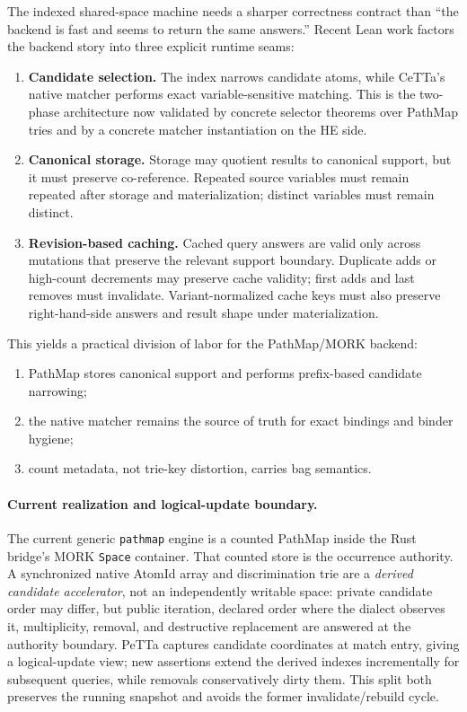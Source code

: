 \documentclass[11pt]{article}
\newcommand{\code}[1]{\texttt{#1}}
\newcommand{\PeTTa}{\textup{PeTTa}}
\newcommand{\HE}{\textup{HE}}
\newcommand{\CeTTa}{\textup{CeTTa}}
\newcommand{\PathMap}{\textup{PathMap}}
\begin{document}
The indexed shared-space machine needs a sharper correctness contract than
``the backend is fast and seems to return the same answers.''  Recent Lean
work factors the backend story into three explicit runtime seams:
\begin{enumerate}
\item \textbf{Candidate selection.}
  The index narrows candidate atoms, while \CeTTa{}'s native matcher performs
  exact variable-sensitive matching.  This is the two-phase architecture now
  validated by concrete selector theorems over \PathMap{} tries and by a
  concrete matcher instantiation on the \HE{} side.
\item \textbf{Canonical storage.}
  Storage may quotient results to canonical support, but it must preserve
  co-reference.  Repeated source variables must remain repeated after storage
  and materialization; distinct variables must remain distinct.
\item \textbf{Revision-based caching.}
  Cached query answers are valid only across mutations that preserve the
  relevant support boundary.  Duplicate adds or high-count decrements may
  preserve cache validity; first adds and last removes must invalidate.
  Variant-normalized cache keys must also preserve right-hand-side answers and
  result shape under materialization.
\end{enumerate}

This yields a practical division of labor for the PathMap/MORK backend:
\begin{enumerate}
\item \PathMap{} stores canonical support and performs prefix-based candidate
  narrowing;
\item the native matcher remains the source of truth for exact bindings and
  binder hygiene;
\item count metadata, not trie-key distortion, carries bag semantics.
\end{enumerate}

\paragraph{Current realization and logical-update boundary.}
The current generic \code{pathmap} engine is a counted \PathMap{} inside
the Rust bridge's MORK \code{Space} container.  That counted store is the
occurrence authority.  A synchronized native AtomId array and discrimination
trie are a \emph{derived candidate accelerator}, not an independently
writable space: private candidate order may differ, but public iteration,
declared order where the dialect observes it, multiplicity, removal, and
destructive replacement are answered at the authority boundary.  \PeTTa{}
captures candidate coordinates at match entry, giving a logical-update view;
new assertions extend the derived indexes incrementally for subsequent
queries, while removals conservatively dirty them.  This split both preserves
the running snapshot and avoids the former invalidate/rebuild cycle.
\end{document}
